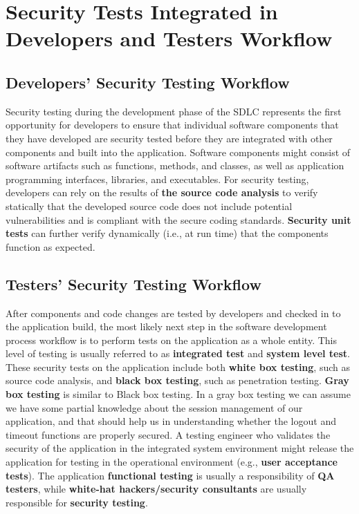 	\section{Security Tests Integrated in Developers and Testers Workflow}

		\subsection{ Developers' Security Testing Workflow}
			Security testing during the development phase of the SDLC represents the first 
			opportunity for developers to ensure that individual software components that they 
			have developed are security tested before they are integrated with other components 
			and built into the application. Software components might consist of software artifacts 
			such as functions, methods, and classes, as well as application programming interfaces, 
			libraries, and executables. For security testing, developers can rely on the results of 
			{\bf the source code analysis} to verify statically that the developed source code does 
			not include potential vulnerabilities and is compliant with the secure coding standards. 
			{\bf Security unit tests} can further verify dynamically (i.e., at run time) that the 
			components function as expected.
		\subsection{Testers' Security Testing Workflow}
			After components and code changes are tested by developers and checked in to the application 
			build, the most likely next step in the software development process workflow is to perform 
			tests on the application as a whole entity. This level of testing is usually referred to as 
			{\bf integrated test} and {\bf system level test}. 
			These security tests on the application include both {\bf white box testing}, such as source 
			code analysis, and {\bf black box testing}, such as penetration testing. {\bf Gray box testing} 
			is similar to Black box testing. In a gray box testing we can assume we have some partial 
			knowledge about the session management of our application, and that should help us in 
			understanding whether the logout and timeout functions are properly secured.
			A testing engineer who validates the security of the application in the integrated system 
			environment might release the application for testing in the operational environment 
			(e.g., {\bf user acceptance tests}). The application {\bf functional testing} is usually 
			a responsibility of {\bf QA testers}, while {\bf white-hat hackers/security consultants} 
			are usually responsible for {\bf security testing}. 

